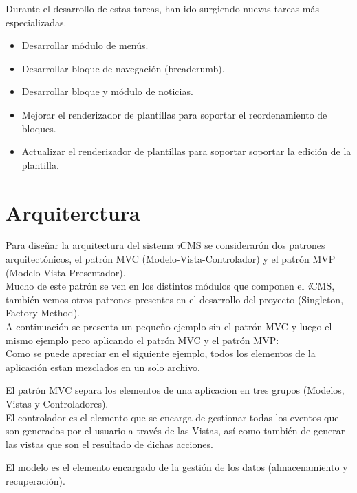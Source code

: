 Durante el desarrollo de estas tareas, han ido surgiendo nuevas tareas m\'as especializadas.

\begin{itemize}
\item Desarrollar m\'odulo de men\'us.
\item Desarrollar bloque de navegaci\'on (breadcrumb).
\item Desarrollar bloque y m\'odulo de noticias.
\item Mejorar el renderizador de plantillas para soportar el reordenamiento de bloques.
\item Actualizar el renderizador de plantillas para soportar soportar la edici\'on de la plantilla.
\end{itemize}

\section{Arquiterctura}
Para dise\~nar la arquitectura del sistema \textit{i}CMS se considerar\'on dos patrones arquitect\'onicos, el patr\'on MVC (Modelo-Vista-Controlador) y el patr\'on MVP (Modelo-Vista-Presentador).\\

Mucho de este patr\'on se ven en los distintos m\'odulos que componen el \textit{i}CMS, tambi\'en vemos otros patrones presentes en el desarrollo del proyecto (Singleton, Factory Method).\\

A continuaci\'on se presenta un peque\~no ejemplo sin el patr\'on MVC y luego el mismo ejemplo pero aplicando el patr\'on MVC y el patr\'on MVP:\\

Como se puede apreciar en el siguiente ejemplo, todos los elementos de la aplicaci\'on estan mezclados en un solo archivo.



El patr\'on MVC separa los elementos de una aplicacion en tres grupos (Modelos, Vistas y Controladores).\\

El controlador es el elemento que se encarga de gestionar todas los eventos que son generados por el usuario a trav\'es de las Vistas, as\'i como tambi\'en de generar las vistas que son el resultado de dichas acciones.



El modelo es el elemento encargado de la gesti\'on de los datos (almacenamiento y recuperaci\'on).

